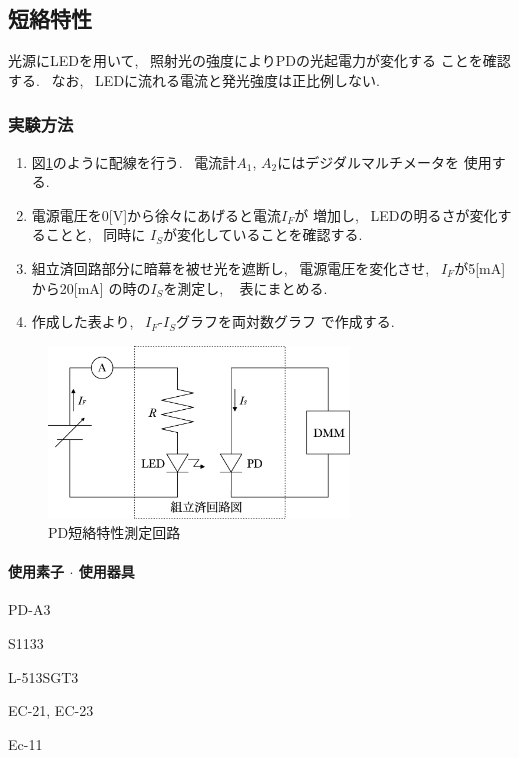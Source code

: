 \documentclass[titlepage]{jsarticle}
\begin{document}
    \subsection{短絡特性} \label{短絡特性}
        光源にLEDを用いて, ~照射光の強度によりPDの光起電力が変化する
        ことを確認する. ~なお, ~LEDに流れる電流と発光強度は正比例しない.

        \subsubsection{実験方法}
            \begin{enumerate}
                \item 図\ref{fig:短絡特性回路}のように配線を行う.
                    ~電流計$A_1$, $A_2$にはデジダルマルチメータを
                    使用する.
                \item 電源電圧を0[V]から徐々にあげると電流$I_F$が
                    増加し, ~LEDの明るさが変化することと, ~同時に
                    $I_S$が変化していることを確認する.
                \item 組立済回路部分に暗幕を被せ光を遮断し,
                    ~電源電圧を変化させ, ~$I_F$が5[mA]から20[mA]
                    の時の$I_S$を測定し, ~ 表にまとめる.
                \item 作成した表より, ~$I_F$-$I_S$グラフを両対数グラフ
                    で作成する.
            \end{enumerate}

            \begin{figure}[ht]
                \centering
                \includegraphics[width=8cm]{images/tannraku.eps}
                \caption{PD短絡特性測定回路}
                \label{fig:短絡特性回路}
            \end{figure}
            
            \paragraph{使用素子 $\cdot$ 使用器具}
                \begin{description}
                    \setlength{\leftskip}{1.5em}
                    \item[組立済回路] PD-A3
                    \item[PD] S1133
                    \item[LED] L-513SGT3
                    \item[デジタルマルチメータ] EC-21, EC-23
                    \item[直流電源] Ec-11
                \end{description}
\end{document}
